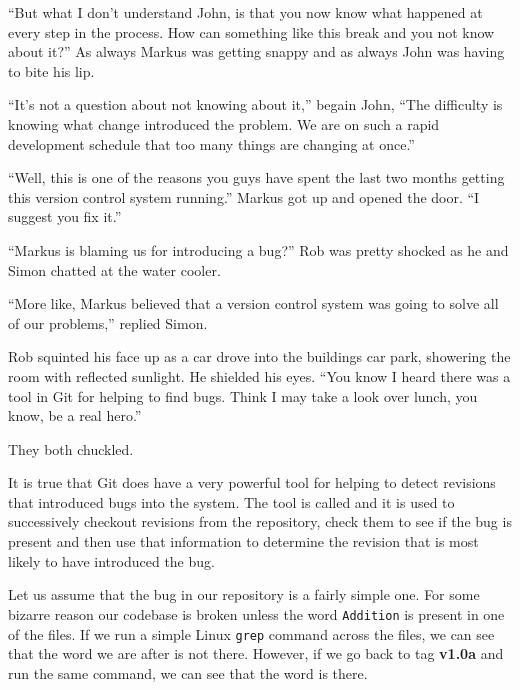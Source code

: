 \begin{trenches}
``But what I don't understand John, is that you now know what happened at every step in the process.
How can something like this break and you not know about it?''
As always Markus was getting snappy and as always John was having to bite his lip.

``It's not a question about not knowing about it,'' begain John, ``The difficulty is knowing what change introduced the problem.
We are on such a rapid development schedule that too many things are changing at once.''

``Well, this is one of the reasons you guys have spent the last two months getting this version control system running.''
Markus got up and opened the door.  ``I suggest you fix it.''

\thoughtbreak

``Markus is blaming us for introducing a bug?'' Rob was pretty shocked as he and Simon chatted at the water cooler.

``More like, Markus believed that a version control system was going to solve all of our problems,'' replied Simon.

Rob squinted his face up as a car drove into the buildings car park, showering the room with reflected sunlight.
He shielded his eyes. ``You know I heard there was a tool in Git for helping to find bugs.
Think I may take a look over lunch, you know, be a real hero.''

They both chuckled.
\end{trenches}

It is true that Git does have a very powerful tool for helping to detect revisions that introduced bugs into the system.
The tool is called  and it is used to successively checkout revisions from the repository,
check them to see if the bug is present and then use that information to determine the revision that is most likely to have introduced the bug.

Let us assume that the bug in our repository is a fairly simple one.
For some bizarre reason our codebase is broken unless the word \texttt{Addition} is present in one of the files.
If we run a simple Linux \texttt{grep} command across the files, we can see that the word we are after is not there.
However, if we go back to tag \textbf{v1.0a} and run the same command, we can see that the word is there.

